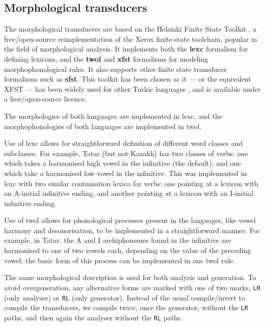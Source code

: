 \documentclass[11pt]{article}
\begin{document}
\subsection{Morphological transducers}

The morphological transducers are based on the Helsinki Finite State Toolkit \citep{hfst/2011}, a free/open-source reimplementation of the Xerox finite-state toolchain, popular in the field of morphological analysis. It implements both the \textbf{lexc} formalism for defining lexicons, and the \textbf{twol} and \textbf{xfst} formalisms for modeling morphophonological rules. It also supports other finite state transducer formalisms such as \textbf{sfst}. This toolkit has been chosen as it --- or the equivalent XFST --- has been widely used for other Turkic languages \citep{coltekin2010,altintas2001,tantug2006,washingtonipasovtyers12,tyerswashingtonsalimzyanbattalov12}, and is available under a free/open-source licence.

The morphologies of both languages are implemented in lexc, and the morphophonologies of both languages are implemented in twol.

Use of lexc allows for straightforward definition of different word classes and subclasses.  For example, Tatar (but not Kazakh) has two classes of verbs: one which takes a harmonised high vowel in the infinitive (the default), and one which take a harmonised low vowel in the infinitive.  This was implemented in lexc with two similar continuation lexica for verbs: one pointing at a lexicon with an A-initial infinitive ending, and another pointing at a lexicon with an I-initial infinitive ending.

Use of twol allows for phonological processes present in the languages, like vowel harmony and desonorisation, to be implemented in a straightforward manner.  For example, in Tatar, the A and I archiphonemes found in the infinitive are harmonised to one of two vowels each, depending on the value of the preceding vowel; the basic form of this process can be implemented in one twol rule.

The same morphological description is used for both analysis and generation. To avoid overgeneration, any alternative forms are 
marked with one of two marks, {\tt {\small LR}} (only analyser) or {\tt {\small RL}} (only generator). Instead of the usual
compile/invert to compile the transducers, we compile twice, once the generator, without the {\tt {\small LR}} paths, and
then again the analyser without the {\tt {\small RL}} paths. 
\end{document}
